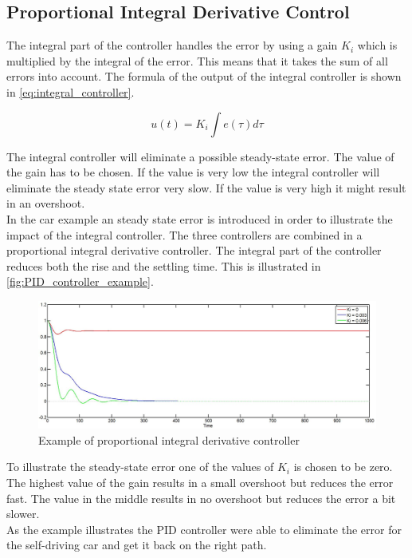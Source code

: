 
\subsection{Proportional Integral Derivative Control} %
\label{sub:integral_control}

The integral part of the controller handles the error by using a gain $K_i$ which is multiplied by the integral of the error. This means that it takes the sum of all errors into account. The formula of the output of the integral controller is shown in \autoref{eq:integral_controller}.

\begin{equation}
\label{eq:integral_controller}
u(t)= K_i \int e(\tau)d\tau
\end{equation}

The integral controller will eliminate a possible steady-state error. The value of the gain has to be chosen. If the value is very low the integral controller will eliminate the steady state error very slow. If the value is very high it might result in an overshoot. \\

In the car example an steady state error is introduced in order to illustrate the impact of the integral controller. The three controllers are combined in a proportional integral derivative controller. The integral part of the controller reduces both the rise and the settling time. This is illustrated in \autoref{fig:PID_controller_example}.\\

\begin{figure}[H]
\centering
\includegraphics[scale=0.35]{images/PIDcontrol.jpg}
\caption{Example of proportional integral derivative controller}
\label{fig:PID_controller_example}
\end{figure}

To illustrate the steady-state error one of the values of $K_i$ is chosen to be zero. The highest value of the gain results in a small overshoot but reduces the error fast. The value in the middle results in no overshoot but reduces the error a bit slower. \\

As the example illustrates the PID controller were able to eliminate the error for the self-driving car and get it back on the right path.


